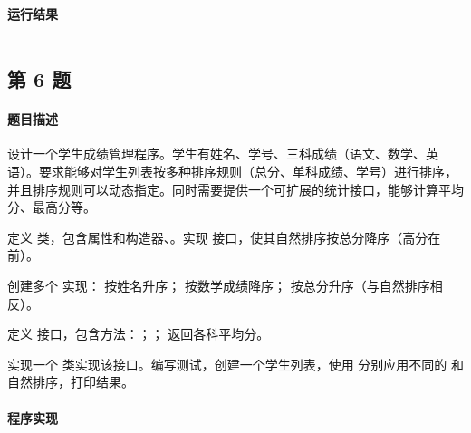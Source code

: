 \documentclass{academics}
\begin{document}
\paragraph{运行结果} {
    \inputminted{text}{../res/P05.out}
}

\subsection{第 6 题}

\paragraph{题目描述} {
    设计一个学生成绩管理程序。学生有姓名、学号、三科成绩（语文、数学、英语）。要求能够对学生列表按多种排序规则（总分、单科成绩、学号）进行排序，并且排序规则可以动态指定。同时需要提供一个可扩展的统计接口，能够计算平均分、最高分等。

    定义  类，包含属性和构造器、。实现  接口，使其自然排序按总分降序（高分在前）。

    创建多个  实现： 按姓名升序； 按数学成绩降序； 按总分升序（与自然排序相反）。

    定义  接口，包含方法：；； 返回各科平均分。

    实现一个  类实现该接口。编写测试，创建一个学生列表，使用  分别应用不同的  和自然排序，打印结果。
}

\paragraph{程序实现} {
    \inputminted[label=Student.java]{java}{../src/P06/Student.java}
    \inputminted[label=ByNameComparator.java]{java}{../src/P06/ByNameComparator.java}
    \inputminted[label=ByMathScoreComparator.java]{java}{../src/P06/ByMathScoreComparator.java}
    \inputminted[label=ByTotalScoreComparator.java]{java}{../src/P06/ByTotalScoreComparator.java}
    \inputminted[label=Statistics.java]{java}{../src/P06/Statistics.java}
    \inputminted[label=SimpleStatistics.java]{java}{../src/P06/SimpleStatistics.java}
    \inputminted[label=StudentSystemTest.java]{java}{../src/P06/StudentSystemTest.java}
}
\end{document}
